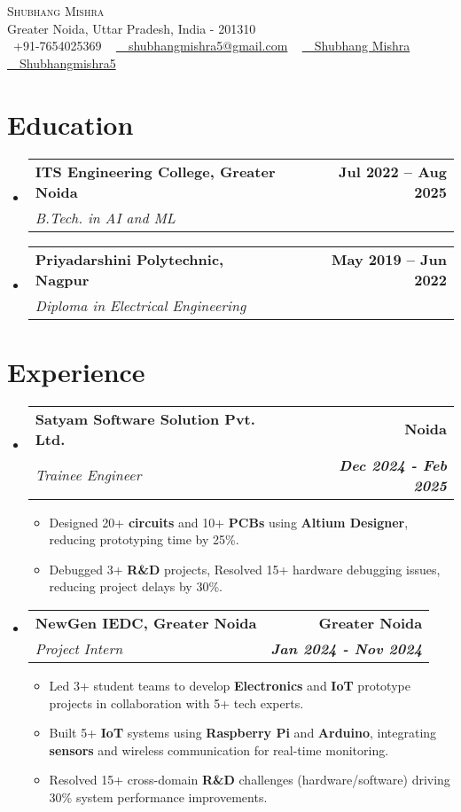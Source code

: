 \documentclass[letterpaper,11pt]{article}
\makeatletter
\newcommand{\resumeItem}[1]{
  \item\small{
    {#1 \vspace{-2pt}}
  }
}
\newcommand{\resumeSubheading}[4]{
  \vspace{-2pt}\item
    \begin{tabular*}{1.0\textwidth}[t]{l@{\extracolsep{\fill}}r}
      \textbf{#1} & \textbf{\small #2} \\
      \textit{\small#3} & \textit{\small #4} \\
    \end{tabular*}\vspace{-7pt}
}
\newcommand{\resumeSubHeadingListStart}{\begin{itemize}[leftmargin=0.0in, label={}]}
\newcommand{\resumeSubHeadingListEnd}{\end{itemize}}
\newcommand{\resumeItemListStart}{\begin{itemize}}
\newcommand{\resumeItemListEnd}{\end{itemize}\vspace{-5pt}}
\makeatother
\begin{document}
\begin{center}
    {\Huge \scshape Shubhang Mishra} \\ \vspace{0.5pt}
    Greater Noida, Uttar Pradesh, India - 201310 \\ \vspace{0.5pt}
    \small \raisebox{-0.0\height}\faPhone\ +91-7654025369 ~ \href{mailto:shubhangmishra5@gmail.com}{\raisebox{-0.0\height}\faEnvelope\  \ shubhangmishra5@gmail.com} ~ \href{https://www.linkedin.com/in/shubhang-mishra-b7b1181b2/
}{\raisebox{-0.0\height}\faLinkedin\ \ Shubhang Mishra}  ~
    \href{https://github.com/Shubhangmishra5}{\raisebox{-0.0\height}\faGithub\ \ Shubhangmishra5}
    \vspace{-8pt}
\end{center}


\section{Education}
  \resumeSubHeadingListStart
    \resumeSubheading
      {ITS Engineering College, Greater Noida}{Jul 2022 -- Aug 2025}
      {B.Tech. in AI and ML}{}
     
    \resumeSubheading
      {Priyadarshini Polytechnic, Nagpur}{May 2019 -- Jun 2022}
      {Diploma in Electrical Engineering}{}  
  \resumeSubHeadingListEnd


\section{Experience}
  \resumeSubHeadingListStart

    \resumeSubheading      
      {Satyam Software Solution Pvt. Ltd.}{Noida}
      {Trainee Engineer }{\textbf{Dec 2024 - Feb 2025}}
      \resumeItemListStart
        \resumeItem{Designed 20+ \textbf{circuits} and 10+ \textbf{PCBs} using \textbf{Altium Designer}, reducing prototyping time by 25\%.  }
        \resumeItem{Debugged 3+ \textbf{R\&D} projects, Resolved 15+ hardware debugging issues, reducing project delays by 30\%. }
      \resumeItemListEnd
    
    
    \resumeSubheading      
      {NewGen IEDC, Greater Noida}{Greater Noida}
      {Project Intern}{\textbf{Jan 2024 - Nov 2024}}
      \resumeItemListStart
        \resumeItem{Led 3+ student teams to develop \textbf{Electronics} and \textbf{IoT} prototype projects in collaboration with 5+ tech experts.}
        \resumeItem{Built 5+ \textbf{IoT} systems using \textbf{Raspberry Pi} and \textbf{Arduino}, integrating \textbf{sensors} and wireless communication for real-time monitoring.}
        \resumeItem{Resolved 15+ cross-domain \textbf{R\&D} challenges (hardware/software) driving 30\% system performance improvements.

}
      \resumeItemListEnd
\resumeSubHeadingListEnd
\end{document}
